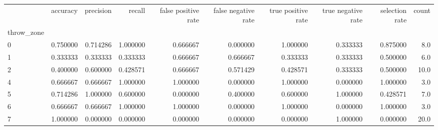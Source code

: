 \begin{tabular}{lrrrrrrrrr}
\toprule
{} &  accuracy &  precision &    recall &  false positive rate &  false negative rate &  true positive rate &  true negative rate &  selection rate &  count \\
throw\_zone &           &            &           &                      &                      &                     &                     &                 &        \\
\midrule
0          &  0.750000 &   0.714286 &  1.000000 &             0.666667 &             0.000000 &            1.000000 &            0.333333 &        0.875000 &    8.0 \\
1          &  0.333333 &   0.333333 &  0.333333 &             0.666667 &             0.666667 &            0.333333 &            0.333333 &        0.500000 &    6.0 \\
2          &  0.400000 &   0.600000 &  0.428571 &             0.666667 &             0.571429 &            0.428571 &            0.333333 &        0.500000 &   10.0 \\
4          &  0.666667 &   0.666667 &  1.000000 &             1.000000 &             0.000000 &            1.000000 &            0.000000 &        1.000000 &    3.0 \\
5          &  0.714286 &   1.000000 &  0.600000 &             0.000000 &             0.400000 &            0.600000 &            1.000000 &        0.428571 &    7.0 \\
6          &  0.666667 &   0.666667 &  1.000000 &             1.000000 &             0.000000 &            1.000000 &            0.000000 &        1.000000 &    3.0 \\
7          &  1.000000 &   0.000000 &  0.000000 &             0.000000 &             0.000000 &            0.000000 &            1.000000 &        0.000000 &   20.0 \\
\bottomrule
\end{tabular}
